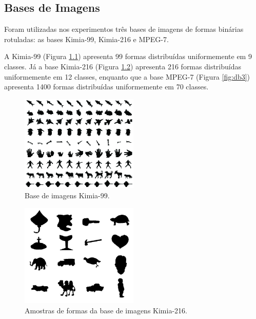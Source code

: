 \documentclass[
	12pt,				%
	openright,			%
	twoside,			%
	a4paper,			%
	english,			%
  	brazil				%
	]{abntex2}
\begin{document}
\begin{apendicesenv}

\partapendices

\chapter{Bases de Imagens}

Foram utilizadas nos experimentos três bases de imagens de formas binárias rotuladas: as bases Kimia-99, Kimia-216 e MPEG-7.

A Kimia-99 (Figura \ref{fig:db1}) apresenta 99 formas distribuídas uniformemente em 9 classes. Já a base Kimia-216 (Figura \ref{fig:db2}) apresenta 216 formas distribuídas uniformemente em 12 classes, enquanto que a base MPEG-7 (Figura \ref{fig:db3})  apresenta 1400 formas distribuídas uniformemente em 70 classes.

\begin{figure}[h!]
  \caption{\label{fig:db1} Base de imagens Kimia-99.}
  \centering
  \includegraphics[width=0.5\textwidth]{db.eps}
\end{figure}

\begin{figure}[h!]
  \caption{\label{fig:db2} Amostras de formas da base de imagens Kimia-216.}
  \centering
  \includegraphics[width=0.5\textwidth]{Dataset.jpg}
\end{figure}


\end{apendicesenv}
\end{document}
